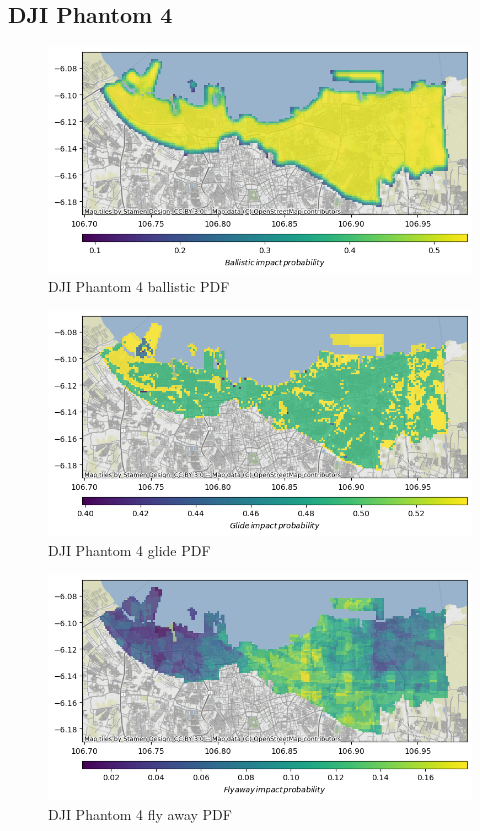 \documentclass[12pt]{report}
\begin{document}
        \subsection{DJI Phantom 4}
        \begin{figure}[H]
            \centering
            \includegraphics[width=\textwidth]{Plot/phantom4/ballistic_pdf.png}
            \caption{DJI Phantom 4 ballistic PDF}
        \end{figure}
        \begin{figure}[H]
            \centering
            \includegraphics[width=\textwidth]{Plot/phantom4/glide_pdf.png}
            \caption{DJI Phantom 4 glide PDF}
        \end{figure}
        \begin{figure}[H]
            \centering
            \includegraphics[width=\textwidth]{Plot/phantom4/fly_away_pdf.png}
            \caption{DJI Phantom 4 fly away PDF}
        \end{figure}
\end{document}
